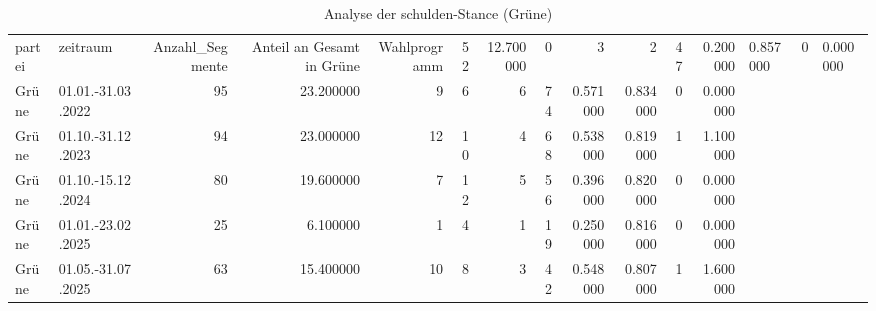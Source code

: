 \begin{table}
\caption{Analyse der schulden-Stance (Grüne)}
\label{tab:meine_tabelle}
\begin{tabular}{llrrrrrrrrrr}
\toprule
partei & zeitraum & Anzahl_Segmente & Anteil an Gesamt in %
\midrule
Grüne & Wahlprogramm & 52 & 12.700000 & 0 & 3 & 2 & 47 & 0.200000 & 0.857000 & 0 & 0.000000 \\
Grüne & 01.01.-31.03.2022 & 95 & 23.200000 & 9 & 6 & 6 & 74 & 0.571000 & 0.834000 & 0 & 0.000000 \\
Grüne & 01.10.-31.12.2023 & 94 & 23.000000 & 12 & 10 & 4 & 68 & 0.538000 & 0.819000 & 1 & 1.100000 \\
Grüne & 01.10.-15.12.2024 & 80 & 19.600000 & 7 & 12 & 5 & 56 & 0.396000 & 0.820000 & 0 & 0.000000 \\
Grüne & 01.01.-23.02.2025 & 25 & 6.100000 & 1 & 4 & 1 & 19 & 0.250000 & 0.816000 & 0 & 0.000000 \\
Grüne & 01.05.-31.07.2025 & 63 & 15.400000 & 10 & 8 & 3 & 42 & 0.548000 & 0.807000 & 1 & 1.600000 \\
\bottomrule
\end{tabular}
\end{table}

